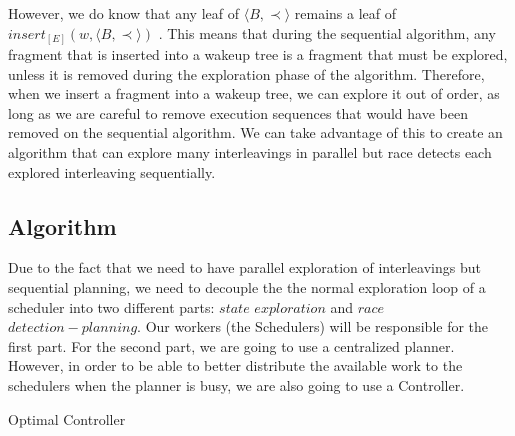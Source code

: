 However, we do know that any leaf of $\langle B , \prec \rangle$ remains a leaf of $insert_{[E]}(w,\langle B , \prec \rangle)$
\cite{AbdullaAronisJohnssonSagonasDPOR2014}. This means that during the sequential algorithm, any fragment that
is inserted into a wakeup tree is a fragment that must be explored, unless it is removed during
the exploration phase of the algorithm. Therefore, when we insert a fragment into a wakeup tree,
we can explore it out of order, as long as we are careful to remove execution sequences that
would have been removed on the sequential algorithm. We can take advantage of this to create an algorithm that can explore 
many interleavings in parallel but race detects each explored interleaving sequentially.

\subsection{Algorithm}

Due to the fact that we need to have parallel exploration of interleavings but sequential planning, we need to decouple the
the normal exploration loop of a scheduler into two different parts: $state$ $exploration$ and $race$ $detection-planning$.
Our workers (the Schedulers) will be responsible for the first part. For the second part, we are going to use a centralized
planner. However, in order to be able to better distribute the available work to the schedulers when the planner is busy,
we are also going to use a Controller.

\begin{algorithm}
    \caption{Optimal Controller}
    \label{optcontrollerloop}

\end{algorithm}

